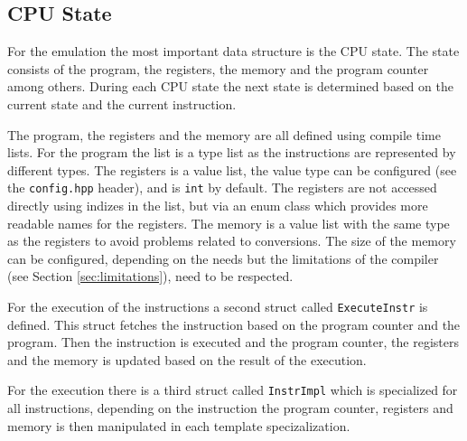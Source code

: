 
\subsection{CPU State}
For the emulation the most important data structure is the CPU state. The state consists of the program, the registers,
the memory and the program counter among others. During each CPU state the next state is determined based on the 
current state and the current instruction.

The program, the registers and the memory are all defined using  compile time lists.
For the program the list is a type list as the instructions are represented by different
types. The registers is a value list, the value type can be configured (see the
\texttt{config.hpp} header), and is \lstinline{int} by default. The registers are not
accessed directly using indizes in the list, but via an enum class which provides
more readable names for the registers. The memory is a value list with the same type
as the registers to avoid problems related to conversions. The size of the memory
can be configured, depending on the needs but the limitations of the compiler 
(see Section \ref{sec:limitations}), need to be respected.


For the execution of the instructions a second struct called \lstinline{ExecuteInstr} is defined. 
This struct fetches the instruction based on the program counter and the program. Then
the instruction is executed and the program counter, the registers and the memory is
updated based on the result of the execution.

For the execution there is a third struct called \lstinline{InstrImpl} which is
specialized for all instructions, depending on the instruction the program counter,
registers and memory is then manipulated in each template specizalization.






